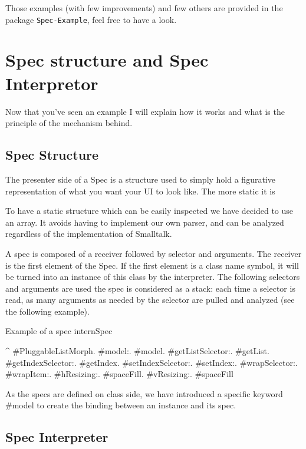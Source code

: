 \documentclass[a4paper,10pt,twoside]{book}
\begin{document}
Those examples (with few improvements) and few others are provided in the package \verb+Spec-Example+, feel free to have a look.

\section{Spec structure and Spec Interpretor}

Now that you've seen an example I will explain how it works and what is the principle of the mechanism behind.

\subsection{Spec Structure}

The presenter side of a Spec is a structure used to simply hold a figurative representation of what you want your UI to look like. The more static it is

To have a static structure which can be easily inspected we have decided to use an array. It avoids having to implement our own parser, and can be analyzed regardless of the implementation of Smalltalk.

A spec is composed of a receiver followed by selector and arguments. The receiver is the first element of the Spec. If the first element is a class name symbol, it will be turned into an instance of this class by the interpreter. The following selectors and arguments are used  the spec is considered as a stack: each time a selector is read, as many arguments as needed by the selector are pulled and analyzed (see the following example).

\begin{method}{Example of a spec}
internSpec

	^ {#PluggableListMorph.
	    	#model:.			  	  #model.
			#getListSelector:.	  #getList.
			#getIndexSelector:.	#getIndex.
			#setIndexSelector:.	#setIndex:.
			#wrapSelector:.	  	 #wrapItem:.
			#hResizing:.			#spaceFill.
			#vResizing:.			#spaceFill		}
\end{method} 

As the specs are defined on class side, we have introduced a specific keyword \#model to create the binding between an instance and its spec.

\subsection{Spec Interpreter}
\end{document}
